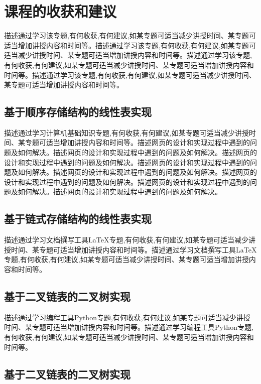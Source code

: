 \documentclass[supercite]{Experimental_Report}
\theoremstyle{definition}
\begin{document}
\newpage

\section{课程的收获和建议}

描述通过学习该专题,有何收获,有何建议,如某专题可适当减少讲授时间、某专题可适当增加讲授内容和时间等。描述通过学习该专题,有何收获,有何建议,如某专题可适当减少讲授时间、某专题可适当增加讲授内容和时间等。描述通过学习该专题,有何收获,有何建议,如某专题可适当减少讲授时间、某专题可适当增加讲授内容和时间等。描述通过学习该专题,有何收获,有何建议,如某专题可适当减少讲授时间、某专题可适当增加讲授内容和时间等。

\subsection{基于顺序存储结构的线性表实现}

描述通过学习计算机基础知识专题,有何收获,有何建议,如某专题可适当减少讲授时间、某专题可适当增加讲授内容和时间等。描述网页的设计和实现过程中遇到的问题及如何解决。描述网页的设计和实现过程中遇到的问题及如何解决。描述网页的设计和实现过程中遇到的问题及如何解决。描述网页的设计和实现过程中遇到的问题及如何解决。描述网页的设计和实现过程中遇到的问题及如何解决。描述网页的设计和实现过程中遇到的问题及如何解决。描述网页的设计和实现过程中遇到的问题及如何解决。描述网页的设计和实现过程中遇到的问题及如何解决。

\subsection{基于链式存储结构的线性表实现}

描述通过学习文档撰写工具LaTeX专题,有何收获,有何建议,如某专题可适当减少讲授时间、某专题可适当增加讲授内容和时间等。描述通过学习文档撰写工具LaTeX专题,有何收获,有何建议,如某专题可适当减少讲授时间、某专题可适当增加讲授内容和时间等。

\subsection{基于二叉链表的二叉树实现}

描述通过学习编程工具Python专题,有何收获,有何建议,如某专题可适当减少讲授时间、某专题可适当增加讲授内容和时间等。描述通过学习编程工具Python专题,有何收获,有何建议,如某专题可适当减少讲授时间、某专题可适当增加讲授内容和时间等。

\subsection{基于二叉链表的二叉树实现}
\end{document}
